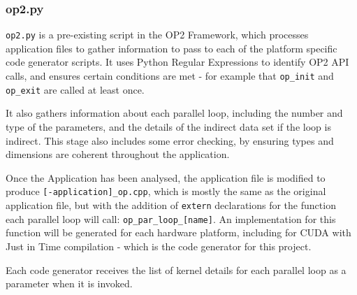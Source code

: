 \subsubsection{op2.py}
\verb|op2.py| is a pre-existing script in the OP2 Framework, which processes application files to gather information to pass to each of the platform specific code generator scripts. It uses Python Regular Expressions to identify OP2 API calls, and ensures certain conditions are met - for example that \verb|op_init| and \verb|op_exit| are called at least once.
\par
It also gathers information about each parallel loop, including the number and type of the parameters, and the details of the indirect data set if the loop is indirect. This stage also includes some error checking, by ensuring types and dimensions are coherent throughout the application.
\par
Once the Application has been analysed, the application file is modified to produce \verb|[-application]_op.cpp|, which is mostly the same as the original application file, but with the addition of \verb|extern| declarations for the function each parallel loop will call: \verb|op_par_loop_[name]|. An implementation for this function will be generated for each hardware platform, including for CUDA with Just in Time compilation - which is the code generator for this project.
\par
Each code generator receives the list of kernel details for each parallel loop as a parameter when it is invoked.

